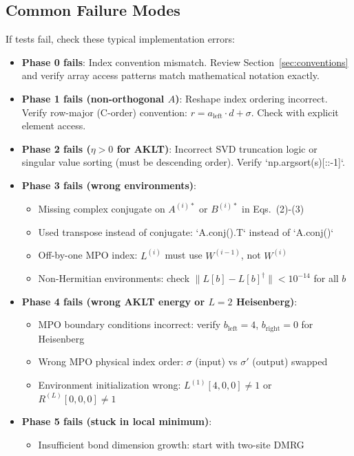 \documentclass[aps,prb,onecolumn,scriptaddress]{revtex4-2}
\begin{document}
\subsection{Common Failure Modes}

If tests fail, check these typical implementation errors:

\begin{itemize}
\item \textbf{Phase 0 fails}: Index convention mismatch. Review Section~\ref{sec:conventions} and verify array access patterns match mathematical notation exactly.
\item \textbf{Phase 1 fails (non-orthogonal $A$)}: Reshape index ordering incorrect. Verify row-major (C-order) convention: $r = a_{\text{left}} \cdot d + \sigma$. Check with explicit element access.
\item \textbf{Phase 2 fails ($\eta > 0$ for AKLT)}: Incorrect SVD truncation logic or singular value sorting (must be descending order). Verify `np.argsort(s)[::-1]`.
\item \textbf{Phase 3 fails (wrong environments)}: 
\begin{itemize}
\item Missing complex conjugate on $A^{(i)*}$ or $B^{(i)*}$ in Eqs.~(2)-(3)
\item Used transpose instead of conjugate: `A.conj().T` instead of `A.conj()`
\item Off-by-one MPO index: $L^{(i)}$ must use $W^{(i-1)}$, not $W^{(i)}$
\item Non-Hermitian environments: check $\|L[b] - L[b]^\dagger\| < 10^{-14}$ for all $b$
\end{itemize}
\item \textbf{Phase 4 fails (wrong AKLT energy or $L=2$ Heisenberg)}: 
\begin{itemize}
\item MPO boundary conditions incorrect: verify $b_{\text{left}}=4$, $b_{\text{right}}=0$ for Heisenberg
\item Wrong MPO physical index order: $\sigma$ (input) vs $\sigma'$ (output) swapped
\item Environment initialization wrong: $L^{(1)}[4,0,0] \neq 1$ or $R^{(L)}[0,0,0] \neq 1$
\end{itemize}
\item \textbf{Phase 5 fails (stuck in local minimum)}: 
\begin{itemize}
\item Insufficient bond dimension growth: start with two-site DMRG

\end{itemize}
\end{itemize}
\end{document}

